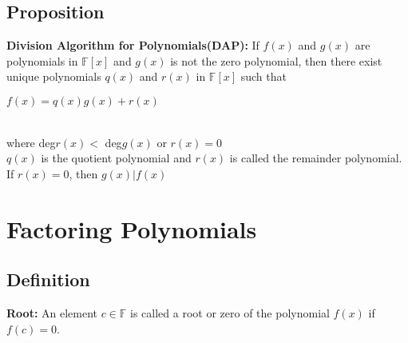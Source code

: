 \documentclass[12pt]{report}
\begin{document}
		\subsection{Proposition}
			\textbf{Division Algorithm for Polynomials(DAP):} If $f(x)$ and $g(x)$ are polynomials in $\mathbb{F}[x]$ and $g(x)$ is not the zero polynomial, then there exist unique polynomials $q(x)$ and $r(x)$ in $\mathbb{F}[x]$ such that \\
			\centerline{$f(x) = q(x)g(x) + r(x)$}\\
			where deg$r(x) < $ deg$g(x)$ or $r(x) = 0$\\
			$q(x)$ is the quotient polynomial and $r(x)$ is called the remainder polynomial. If $r(x)=0$, then $g(x)|f(x)$
	\section{Factoring Polynomials}
		\subsection{Definition}
			\textbf{Root:} An element $c \in \mathbb{F}$ is called a root or zero of the polynomial $f(x)$ if $f(c) = 0$. 
			\\
\end{document}
